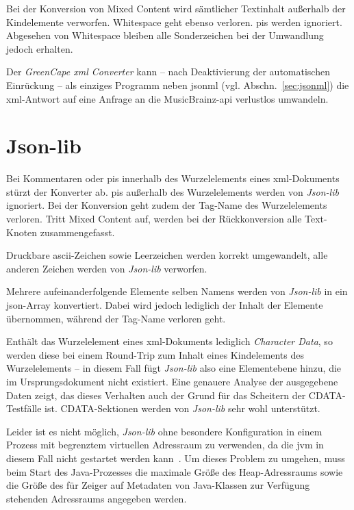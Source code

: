 Bei der Konversion von Mixed Content wird sämtlicher Textinhalt außerhalb der Kind\-elemente verworfen. Whitespace geht ebenso verloren. \glspl{pi} werden ignoriert. Abgesehen von Whitespace bleiben alle Sonderzeichen bei der Umwandlung jedoch erhalten.

Der \emph{GreenCape \acrshort{xml} Converter} kann -- nach Deaktivierung der automatischen Einrückung -- als einziges Programm neben \acrshort{jsonml} (vgl. Abschn.~\ref{sec:jsonml}) die \acrshort{xml}-Antwort auf eine Anfrage an die MusicBrainz-\acrshort{api} verlustlos umwandeln.

\section{Json-lib}
\label{sec:jsonlib}

Bei Kommentaren oder \glspl{pi} innerhalb des Wurzelelements eines \acrshort{xml}-Dokuments stürzt der Konverter ab. \glspl{pi} außerhalb des Wurzelelements werden von \emph{Json-lib} ignoriert. Bei der Konversion geht zudem der Tag-Name des Wurzelelements verloren. Tritt Mixed Content auf, werden bei der Rückkonversion alle Text-Knoten zusammengefasst.

Druckbare \acrshort{ascii}-Zeichen sowie Leerzeichen werden korrekt umgewandelt, alle anderen Zeichen werden von \emph{Json-lib} verworfen.

Mehrere aufeinanderfolgende Elemente selben Namens werden von \emph{Json-lib} in ein \acrshort{json}-Array konvertiert. Dabei wird jedoch lediglich der Inhalt der Elemente übernommen, während der Tag-Name verloren geht.

Enthält das Wurzelelement eines \acrshort{xml}-Dokuments lediglich \emph{Character Data}, so werden diese bei einem Round-Trip zum Inhalt eines Kindelements des Wurzelelements -- in diesem Fall fügt \emph{Json-lib} also eine Elementebene hinzu, die im Ursprungsdokument nicht existiert. Eine genauere Analyse der ausgegebene Daten zeigt, das dieses Verhalten auch der Grund für das Scheitern der CDATA-Testfälle ist. CDATA-Sektionen werden von \emph{Json-lib} sehr wohl unterstützt.

Leider ist es nicht möglich, \emph{Json-lib} ohne besondere Konfiguration in einem Prozess mit begrenztem virtuellen Adressraum zu verwenden, da die \acrfull{jvm} in diesem Fall nicht gestartet werden kann~\cite{jvmmemlimit}. Um dieses Problem zu umgehen, muss beim Start des Java-Prozesses die maximale Größe des Heap-Adressraums sowie die Größe des für Zeiger auf Metadaten von Java-Klassen zur Verfügung stehenden Adressraums angegeben werden.

